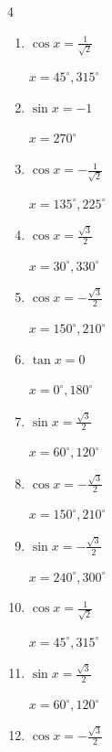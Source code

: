 \begin{multicols}{4}
\begin{enumerate}
        $\displaystyle x = 60^{\circ} , 240^{\circ}$

  \item $\displaystyle \cos{x}  = \frac{1}{\sqrt{2}}$

        $\displaystyle x = 45^{\circ} , 315^{\circ}$

  \item $\displaystyle \sin{x}  = -1$

        $\displaystyle x = 270^{\circ}$

  \item $\displaystyle \cos{x}  = -\frac{1}{\sqrt{2}}$

        $\displaystyle x = 135^{\circ} , 225^{\circ}$

  \item $\displaystyle \cos{x}  = \frac{\sqrt{3}}{2}$

        $\displaystyle x = 30^{\circ} , 330^{\circ}$

  \item $\displaystyle \cos{x}  = -\frac{\sqrt{3}}{2}$

        $\displaystyle x = 150^{\circ} , 210^{\circ}$

  \item $\displaystyle \tan{x}  = 0$

        $\displaystyle x = 0^{\circ} , 180^{\circ}$

  \item $\displaystyle \sin{x}  = \frac{\sqrt{3}}{2}$

        $\displaystyle x = 60^{\circ} , 120^{\circ}$

  \item $\displaystyle \cos{x}  = -\frac{\sqrt{3}}{2}$

        $\displaystyle x = 150^{\circ} , 210^{\circ}$

  \item $\displaystyle \sin{x}  = -\frac{\sqrt{3}}{2}$

        $\displaystyle x = 240^{\circ} , 300^{\circ}$

  \item $\displaystyle \cos{x}  = \frac{1}{\sqrt{2}}$

        $\displaystyle x = 45^{\circ} , 315^{\circ}$

  \item $\displaystyle \sin{x}  = \frac{\sqrt{3}}{2}$

        $\displaystyle x = 60^{\circ} , 120^{\circ}$

  \item $\displaystyle \cos{x}  = -\frac{\sqrt{3}}{2}$


\end{enumerate}
\end{multicols}
